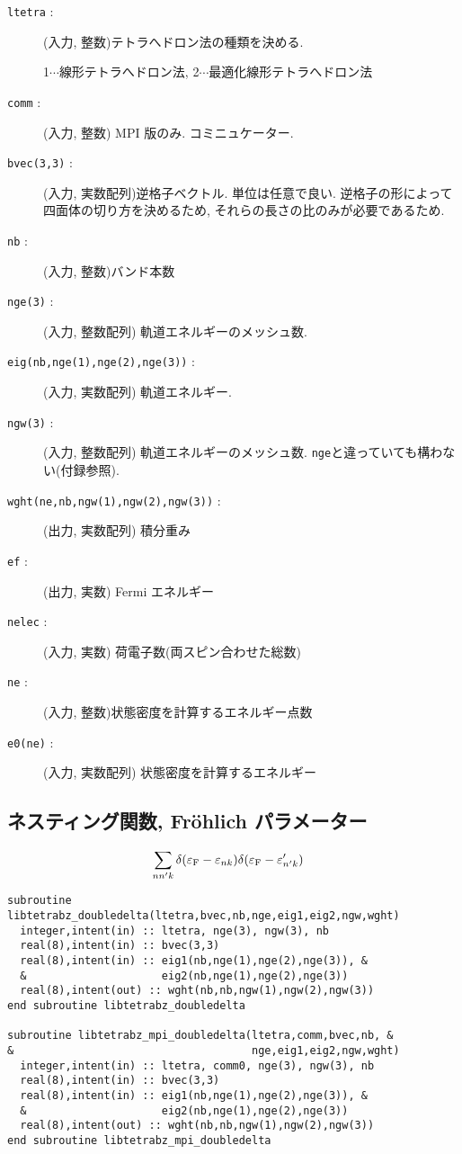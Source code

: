 \documentclass[12pt]{jarticle}
\begin{document}
\begin{description}
\item[\texttt{ltetra} : ] (入力, 整数)テトラへドロン法の種類を決める. 

  1$\cdots$線形テトラへドロン法, 
  2$\cdots$最適化線形テトラへドロン法
\item[\texttt{comm} : ] (入力, 整数) MPI 版のみ. コミニュケーター. 
\item[\texttt{bvec(3,3)} : ] (入力, 実数配列)逆格子ベクトル. 単位は任意で良い. 
逆格子の形によって四面体の切り方を決めるため, それらの長さの比のみが必要であるため. 
\item[\texttt{nb} : ] (入力, 整数)バンド本数
\item[\texttt{nge(3)} : ] (入力, 整数配列) 軌道エネルギーのメッシュ数. 
\item[\texttt{eig(nb,nge(1),nge(2),nge(3))} : ] (入力, 実数配列) 軌道エネルギー. 
\item[\texttt{ngw(3)} : ] (入力, 整数配列) 軌道エネルギーのメッシュ数. 
  \verb|nge|と違っていても構わない(付録参照). 
\item[\texttt{wght(ne,nb,ngw(1),ngw(2),ngw(3))} : ] (出力, 実数配列) 積分重み
\item[\texttt{ef} : ] (出力, 実数) Fermi エネルギー
\item[\texttt{nelec} : ] (入力, 実数) 荷電子数(両スピン合わせた総数)
\item[\texttt{ne} : ] (入力, 整数)状態密度を計算するエネルギー点数
\item[\texttt{e0(ne)} : ] (入力, 実数配列) 状態密度を計算するエネルギー
\end{description}

\newpage

\subsection{ネスティング関数, Fr\"ohlich パラメーター}

\begin{align}
&\sum_{n n' k} \delta(\varepsilon_{\rm F} - \varepsilon_{n k})
\delta(\varepsilon_{\rm F} - \varepsilon'_{n' k})
\end{align}

\begin{verbatim}
subroutine libtetrabz_doubledelta(ltetra,bvec,nb,nge,eig1,eig2,ngw,wght)
  integer,intent(in) :: ltetra, nge(3), ngw(3), nb
  real(8),intent(in) :: bvec(3,3)
  real(8),intent(in) :: eig1(nb,nge(1),nge(2),nge(3)), &
  &                     eig2(nb,nge(1),nge(2),nge(3))
  real(8),intent(out) :: wght(nb,nb,ngw(1),ngw(2),ngw(3))
end subroutine libtetrabz_doubledelta

subroutine libtetrabz_mpi_doubledelta(ltetra,comm,bvec,nb, &
&                                     nge,eig1,eig2,ngw,wght)
  integer,intent(in) :: ltetra, comm0, nge(3), ngw(3), nb
  real(8),intent(in) :: bvec(3,3)
  real(8),intent(in) :: eig1(nb,nge(1),nge(2),nge(3)), &
  &                     eig2(nb,nge(1),nge(2),nge(3))
  real(8),intent(out) :: wght(nb,nb,ngw(1),ngw(2),ngw(3))
end subroutine libtetrabz_mpi_doubledelta
\end{verbatim}
\end{document}
